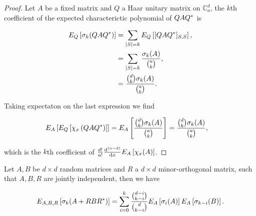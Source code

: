 \begin{proof}
    Let $A$ be a fixed matrix and $Q$ a Haar unitary matrix on $\mathbb C_{a}^d$, the $k$th coefficient of the expected characterictic polynomial of $QAQ^*$ is 

    \begin{align*}
        E_Q \left[ \sigma_k(QAQ^*) \right] &= \sum_{\lvert S \rvert = k} E_Q\left[ [QAQ^*]_{S,S} \right],\\ 
        &= \sum_{\lvert S \rvert = k} \frac{\sigma_k(A)}{\binom ak},\\ 
        &= \frac{\binom{d}{k} \sigma_k(A)}{\binom{a}{k}}.
    \end{align*}

    Taking expectaton on the last expression we find

    \begin{align*}
        E_A \left[E_Q\left[ \chi_x \left( Q A Q^* \right) \right]\right] &= E_A \left[ \frac{\binom{d}{k} \sigma_k(A)}{\binom{a}{k}} \right] = \frac{\binom{d}{k} \sigma_k(A)}{\binom{a}{k}},
    \end{align*}

    \noindent which is the $k$th coefficient of $\frac{d!}{a!} \frac{\mathrm d^{(a-d)}}{\mathrm d x} E_A \left[\chi_x(A) \right]$.
\end{proof}


\begin{theorem} \label{thm:implies_symmad}
    Let $A, B$ be $d\times d$ random matrices and $R$ a $d\times d$ minor-orthogonal matrix, such that $A, B, R$ are jointly independent, then we have

    \begin{equation*}
        E_{A,B,R}\left[ \sigma_k(A + RBR^*) \right] =  \sum_{i=0}^k \frac{\binom{d-i}{k-i}}{\binom{d}{k-i}}E_{A} \left[\sigma_i(A)\right] E_{A}\left[\sigma_{k-i}(B)\right].
    \end{equation*}
\end{theorem}

